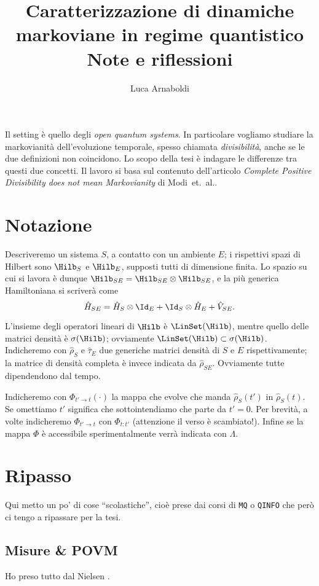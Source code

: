 \documentclass[a4]{article}
\title{Caratterizzazione di dinamiche markoviane in regime quantistico \\[1ex]
	   \large{Note e riflessioni}}
\author{Luca Arnaboldi}
\begin{document}
\maketitle
\tableofcontents
\vspace{6pt}
Il setting è quello degli \emph{open quantum systems}. In particolare vogliamo studiare
la markovianità dell'evoluzione temporale, spesso chiamata \emph{divisibilità}, anche se
le due definizioni non coincidono. Lo scopo della tesi è indagare le differenze tra questi
due concetti. Il lavoro si basa sul contenuto dell'articolo \emph{Complete Positive
Divisibility does not mean Markovianity} di Modi~et.~al.\cite{CPdoesnotimply}.

\section{Notazione}
Descriveremo un sistema \(S\), a contatto con un ambiente \(E\); i rispettivi spazi di
Hilbert sono \(\Hilb_S\) e \(\Hilb_E\), supposti tutti di dimensione finita. Lo spazio
su cui si lavora è dunque 
\(\Hilb_{SE} = \Hilb_{SE} \otimes \Hilb_{SE}\), e la più generica Hamiltoniana si
scriverà come
\[\hat{H}_{SE} = \hat{H}_S \otimes  \Id_E + \Id_S \otimes  \hat{H}_E + \hat{V}_{SE}.\]

L'insieme degli operatori lineari di \(\Hilb\) è \(\LinSet(\Hilb)\), mentre quello delle
matrici densità è \(\sigma(\Hilb)\); ovviamente \(\LinSet(\Hilb) \subset \sigma(\Hilb)\).
Indicheremo con \(\hat{\rho}_S\) e \(\hat{\tau}_E\) due generiche matrici densità di \(S\)
e \(E\) rispettivamente; la matrice di densità completa è invece indicata da \(\hat{\rho}_{SE}\).
Ovviamente tutte dipendendono dal tempo.


Indicheremo con \(\Phi_{t'\to t}(\cdot)\) la mappa che evolve che manda \(\hat{\rho}_S(t')\)
in \(\hat{\rho}_S(t)\). Se omettiamo \(t'\) significa che sottointendiamo che parte da \(t'=0\).
Per brevità, a volte indicheremo \(\Phi_{t'\to t}\) con \(\Phi_{t:t'}\) (attenzione il verso è scambiato!).
Infine se la mappa \(\Phi\) è accessibile sperimentalmente verrà indicata con
\(\Lambda\).

\section{Ripasso}
Qui metto un po' di cose ``scolastiche'', cioè prese dai corsi di \texttt{MQ} o \texttt{QINFO}
che però ci tengo a ripassare per la tesi.
\subsection{Misure \& POVM}
Ho preso tutto dal Nielsen \cite{nielsen2010quantum}.
\end{document}
